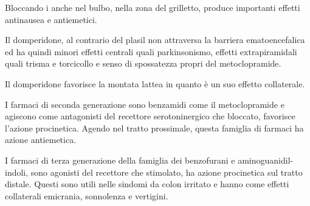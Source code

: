 Bloccando i  anche nel bulbo, nella zona del grilletto, produce importanti effetti antinausea e antiemetici.

Il domperidone, al contrario del plasil non attraversa la barriera ematoencefalica ed ha quindi minori effetti centrali quali parkinsonismo, effetti extrapiramidali quali trisma e torcicollo e senso di spossatezza propri del metoclopramide.

Il domperidone favorisce la montata lattea in quanto è un suo effetto collaterale.

I farmaci di seconda generazione sono benzamidi come il metoclopramide e agiscono come antagonisti del recettore serotoninergico  che bloccato, favorisce l'azione procinetica. Agendo nel tratto prossimale, questa famiglia di farmaci ha azione antiemetica.

I farmaci di terza generazione della famiglia dei benzofurani e aminoguanidil-indoli, sono agonisti del recettore  che stimolato, ha azione procinetica sul tratto distale. Questi sono utili nelle sindomi da colon irritato e hanno come effetti collaterali emicrania, sonnolenza e vertigini.



\newpage